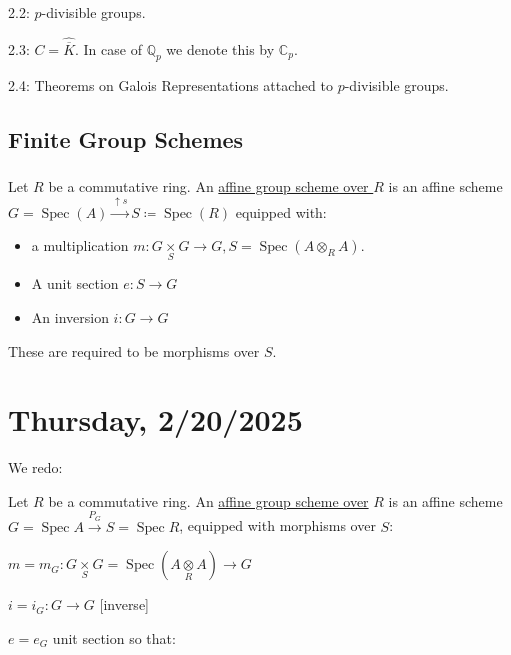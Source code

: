 \documentclass{article}
\theoremstyle{definition}
\numberwithin{theorem}{subsection}
\begin{document}
    2.2: \(p\)-divisible groups.

    2.3: \(C = \widehat{\overline{K}}\). In case of \(\mathbb{Q}_p\) we denote this by \(\mathbb{C}_p\).
    
    2.4: Theorems on Galois Representations attached to \(p\)-divisible groups.
   
    \subsection{Finite Group Schemes}

    \subsubsection{} Let \(R\) be a commutative ring. An \underline{affine group scheme over \(R\)} is an affine scheme \(G = \operatorname{Spec}(A) \xrightarrow{\uparrow s} S \coloneqq \operatorname{Spec}(R)\) equipped with:

    \begin{itemize}
        \item a multiplication \(m: G \underset{S}{\times} G \to G, S = \operatorname{Spec}(A \otimes_R A)\).
        \item A unit section \(e: S \to G\)
        \item An inversion \(i: G \to G\)    
    \end{itemize} 

    These are required to be morphisms over \(S\).

    \section*{Thursday, 2/20/2025}
    
    We redo:

    Let \(R\) be a commutative ring. An \underline{affine group scheme over} \(R\) is an affine scheme \(G = \operatorname{Spec} A \xrightarrow{P_G} S = \operatorname{Spec} R\), equipped with morphisms over \(S\):

    \(m = m_G: G \underset{S}{\times} G = \operatorname{Spec} (A \underset{R}{\otimes} A) \to G\)
    
    \(i = i_G: G \to G\) [inverse]

    \(e = e_G\) unit section so that:

    \begin{center}
    \end{center}
\end{document}
